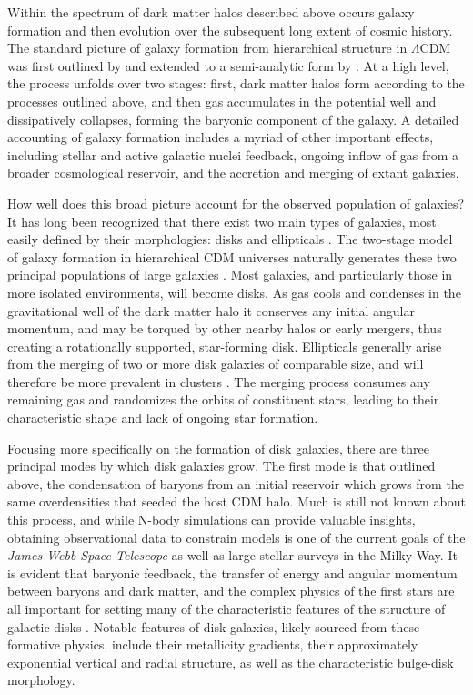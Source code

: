Within the spectrum of dark matter halos described above occurs galaxy formation and then evolution over the subsequent long extent of cosmic history. The standard picture of galaxy formation from hierarchical structure in $\Lambda$CDM was first outlined by \textcite{white78} and extended to a semi-analytic form by \textcite{white91}. At a high level, the process unfolds over two stages: first, dark matter halos form according to the processes outlined above, and then gas accumulates in the potential well and dissipatively collapses, forming the baryonic component of the galaxy. A detailed accounting of galaxy formation includes a myriad of other important effects, including stellar and active galactic nuclei feedback, ongoing inflow of gas from a broader cosmological reservoir, and the accretion and merging of extant galaxies.

How well does this broad picture account for the observed population of galaxies? It has long been recognized that there exist two main types of galaxies, most easily defined by their morphologies: disks and ellipticals \parencite[e.g. the famous `tuning fork' classification of][]{hubble26}. The two-stage model of galaxy formation in hierarchical CDM universes naturally generates these two principal populations of large galaxies \parencite{fall79,efstathiou83,blumenthal84}. Most galaxies, and particularly those in more isolated environments, will become disks. As gas cools and condenses in the gravitational well of the dark matter halo it conserves any initial angular momentum, and may be torqued by other nearby halos or early mergers, thus creating a rotationally supported, star-forming disk. Ellipticals generally arise from the merging of two or more disk galaxies of comparable size, and will therefore be more prevalent in clusters \parencite{toomre72,gerhard81,barnes88}. The merging process consumes any remaining gas and randomizes the orbits of constituent stars, leading to their characteristic shape and lack of ongoing star formation.

Focusing more specifically on the formation of disk galaxies, there are three principal modes by which disk galaxies grow. The first mode is that outlined above, the condensation of baryons from an initial reservoir which grows from the same overdensities that seeded the host CDM halo. Much is still not known about this process, and while N-body simulations can provide valuable insights, obtaining observational data to constrain models is one of the current goals of the \textit{James Webb Space Telescope} as well as large stellar surveys in the Milky Way. It is evident that baryonic feedback, the transfer of energy and angular momentum between baryons and dark matter, and the complex physics of the first stars are all important for setting many of the characteristic features of the structure of galactic disks \parencite{vandenbosch01}. Notable features of disk galaxies, likely sourced from these formative physics, include their metallicity gradients, their approximately exponential vertical and radial structure, as well as the characteristic bulge-disk morphology.

